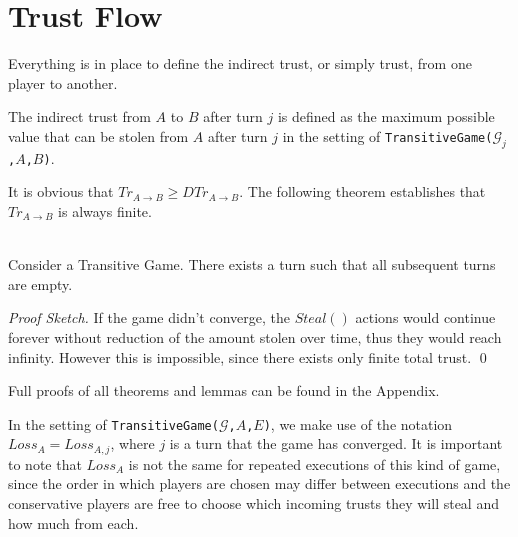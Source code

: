 \documentclass[11pt]{llncs}
\theoremstyle{definition}
\newenvironment{proofsketch}{\textit{Proof Sketch.}}{\qed \smallskip \ \\}
\begin{document}
  \section{Trust Flow}
    Everything is in place to define the indirect trust, or simply trust, from one player to another.
    \begin{definition}
       The indirect trust from $A$ to $B$ after turn $j$ is defined as the maximum possible value that can be stolen from
       $A$ after turn $j$ in the setting of \texttt{TransitiveGame(}$\mathcal{G}_j$\texttt{,}$A$\texttt{,}$B$\texttt{)}.
    \end{definition}
    It is obvious that $Tr_{A \rightarrow B} \geq DTr_{A \rightarrow B}$. The following theorem establishes that
    $Tr_{A \rightarrow B}$ is always finite.
    \begin{theorem} \ \\
       \label{convergence}
       Consider a Transitive Game. There exists a turn such that all subsequent turns are empty.
    \end{theorem}
    \begin{proofsketch}
       If the game didn't converge, the $Steal\left(\right)$ actions would continue forever without reduction of the amount
       stolen over time, thus they would reach infinity. However this is impossible, since there exists only finite total
       trust.
    \end{proofsketch}

    Full proofs of all theorems and lemmas can be found in the Appendix.

    In the setting of \texttt{TransitiveGame(}$\mathcal{G}$\texttt{,}$A$\texttt{,}$E$\texttt{)}, we make use of the notation
    $Loss_A = Loss_{A, j}$, where $j$ is a turn that the game has converged. It is important to note that $Loss_A$ is
    not the same for repeated executions of this kind of game, since the order in which players are chosen may differ between
    executions and the conservative players are free to choose which incoming trusts they will steal and how much from each.
\end{document}
